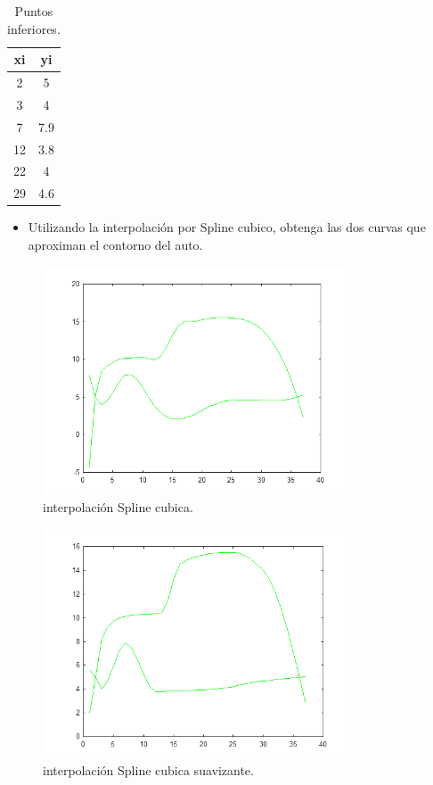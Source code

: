 \documentclass{udpreport}
\begin{document}
\begin{enumerate}
 \begin{table}[H]
    \centering
        \begin{tabular} { |c|c|}
        
        \hline
        xi  &  yi\\
        \hline
        2 &  5       \\
         \hline
        3 &  4        \\
         \hline
        7 &  7.9        \\
         \hline
        12 &  3.8        \\
         \hline
        22 &  4        \\
         \hline
        29 & 4.6        \\
        \hline
        \end{tabular}
        \caption{Puntos inferiores.}
    \end{table}
 \begin{itemize}
\item Utilizando la interpolación por Spline cubico, obtenga las dos curvas que aproximan el contorno del auto.
\end{itemize}

\begin{figure}[H]
    \centering
    \includegraphics[width=9cm]{interp_spline}
    \caption{interpolación Spline cubica.} \label{fig:interp_spline}
\end{figure}

\begin{figure}[H]
    \centering
    \includegraphics[width=9cm]{interp_spline_csaps}
    \caption{interpolación Spline cubica suavizante.} \label{fig:interp_spline_csaps}
\end{figure}


\end{enumerate}
\end{document}
